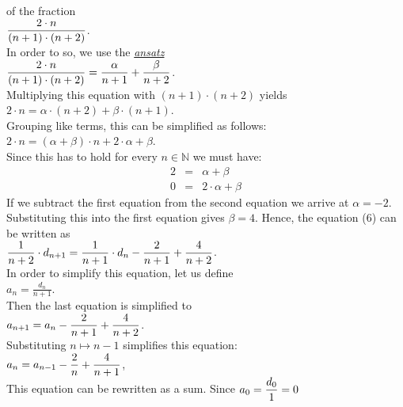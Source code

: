 of the fraction
\\[0.2cm]
\hspace*{1.3cm}
$\displaystyle\frac{2\cdot n}{(n+1)\cdot(n+2)}$.
\\[0.2cm] 
In order to so, we use the \href{http://en.wikipedia.org/wiki/Ansatz}{\emph{ansatz}}
\\[0.2cm]
\hspace*{1.3cm}
$\displaystyle\frac{2\cdot n}{(n+1)\cdot(n+2)} = \frac{\alpha}{n+1} + \frac{\beta}{n+2}$.
\\[0.2cm] 
Multiplying this equation with $(n+1) \cdot (n+2)$ yields
\\[0.2cm]
\hspace*{1.3cm}
$ 2\cdot n = \alpha \cdot (n+2) + \beta \cdot (n+1)$.
\\[0.2cm]
Grouping like terms, this can be simplified as follows:
\\[0.2cm]
\hspace*{1.3cm}
$2\cdot n = (\alpha + \beta) \cdot n + 2 \cdot \alpha  + \beta$.
\\[0.2cm]
Since this has to hold for every $n \in \mathbb{N}$ we must have:
\begin{eqnarray*}
  2 & = & \alpha + \beta \\
  0 & = & 2 \cdot \alpha + \beta 
\end{eqnarray*}
If we subtract the first equation from the second equation we arrive at
 $\alpha = -2$.  Substituting this into the first equation gives $\beta = 4$.
Hence, the equation (6) can be written as
\\[0.2cm]
\hspace*{1.3cm}
$\displaystyle\frac{1}{n+2} \cdot d_{n+1} = \frac{1}{n+1}\cdot d_{n} - \frac{2}{n+1} + \frac{4}{n+2}$.  
\\[0.2cm]  
In order to simplify this equation, let us define
\\[0.2cm]
\hspace*{1.3cm}
 $\displaystyle a_n = \frac{d_n}{n+1}$. 
\\[0.2cm] 
Then the last equation is simplified to
\\[0.2cm]
\hspace*{1.3cm}
$\displaystyle a_{n+1} = a_{n} - \frac{2}{n+1} + \frac{4}{n+2}$.
\\[0.2cm] 
Substituting $n \mapsto n-1$ simplifies this equation: 
\\[0.2cm]
\hspace*{1.3cm}
$\displaystyle a_{n} = a_{n-1} - \frac{2}{n} + \frac{4}{n+1}$,
\\[0.2cm] 
This equation can be rewritten as a sum.  Since $a_0 = \displaystyle\frac{d_0}{1} = 0$
